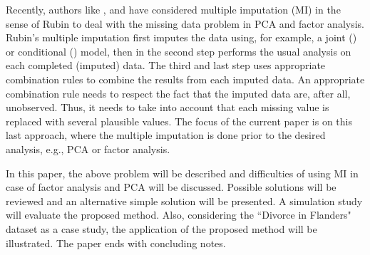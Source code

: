 \documentclass[11pt,a5paper,twoside]{book}
\begin{document}
\begin{sloppypar}
Recently, authors like \citet*{josse2011}, \cite{dray2015} and \cite{lorenzo2016} have considered multiple imputation (MI) in the sense of Rubin \citep{rubin2004,schafer1997,carpenter2012} to deal with the missing data problem in PCA and factor analysis. Rubin's multiple imputation first imputes the data using, for example, a joint (\cite{schafer1997}) or conditional (\cite{van2007}) model, then in the second step performs the usual analysis on each completed (imputed) data. The third and last step uses appropriate combination rules to combine the results from each imputed data. An appropriate combination rule needs to respect the fact that the imputed data are, after all, unobserved. Thus, it needs to take into account that each missing value is replaced with several plausible values. The focus of the current paper is on this last approach, where the multiple imputation is done prior to the desired analysis, e.g., PCA or factor analysis. 

\end{sloppypar}



In this paper, the above problem will be described and difficulties of using MI in case of factor analysis and PCA will be discussed. Possible solutions will be reviewed and an alternative simple solution will be presented. A simulation study will evaluate the proposed method. Also, considering the ``Divorce in Flanders" dataset as a case study, the application of the proposed method will be illustrated. The paper ends with concluding notes.
\end{document}
